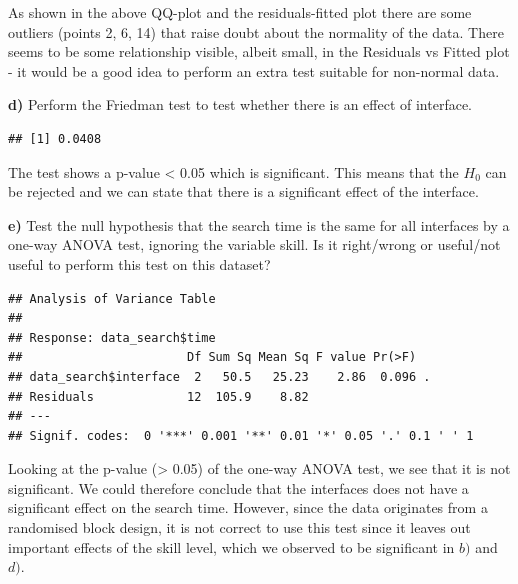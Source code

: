 \documentclass[
  10pt,
]{article}
\newenvironment{Shaded}{\begin{snugshade}}{\end{snugshade}}
\newcommand{\FunctionTok}[1]{\textcolor[rgb]{0.00,0.00,0.00}{#1}}
\newcommand{\NormalTok}[1]{#1}
\newcommand{\SpecialCharTok}[1]{\textcolor[rgb]{0.00,0.00,0.00}{#1}}
\begin{document}
As shown in the above QQ-plot and the residuals-fitted plot there are
some outliers (points 2, 6, 14) that raise doubt about the normality of
the data. There seems to be some relationship visible, albeit small, in
the Residuals vs Fitted plot - it would be a good idea to perform an
extra test suitable for non-normal data.

\textbf{d)} Perform the Friedman test to test whether there is an effect
of interface.

\begin{Shaded}
\end{Shaded}

\begin{verbatim}
## [1] 0.0408
\end{verbatim}

The test shows a p-value \textless{} 0.05 which is significant. This
means that the \(H_0\) can be rejected and we can state that there is a
significant effect of the interface.

\textbf{e)} Test the null hypothesis that the search time is the same
for all interfaces by a one-way ANOVA test, ignoring the variable skill.
Is it right/wrong or useful/not useful to perform this test on this
dataset?

\begin{Shaded}
\end{Shaded}

\begin{verbatim}
## Analysis of Variance Table
## 
## Response: data_search$time
##                       Df Sum Sq Mean Sq F value Pr(>F)  
## data_search$interface  2   50.5   25.23    2.86  0.096 .
## Residuals             12  105.9    8.82                 
## ---
## Signif. codes:  0 '***' 0.001 '**' 0.01 '*' 0.05 '.' 0.1 ' ' 1
\end{verbatim}

Looking at the p-value (\textgreater{} 0.05) of the one-way ANOVA test,
we see that it is not significant. We could therefore conclude that the
interfaces does not have a significant effect on the search time.
However, since the data originates from a randomised block design, it is
not correct to use this test since it leaves out important effects of
the skill level, which we observed to be significant in \(b)\) and
\(d)\).
\end{document}
